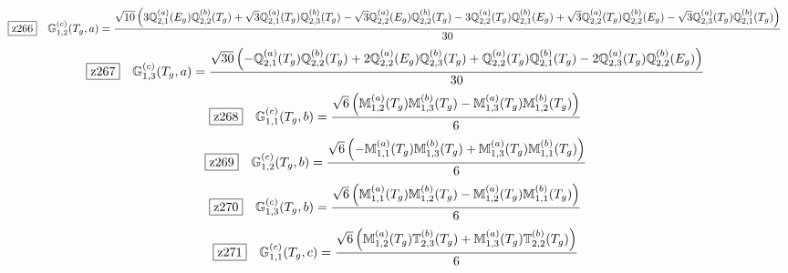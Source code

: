 \documentclass[fleqn,10pt,landscape]{jsarticle}
\begin{document}
\begin{dmath*}
\hspace*{3mm}\fbox{z266}\quad \mathbb{G}_{1,2}^{(c)}(T_{g},a)=\frac{\sqrt{10} \left(3 \mathbb{Q}_{2,1}^{(a)}(E_{g}) \mathbb{Q}_{2,2}^{(b)}(T_{g}) + \sqrt{3} \mathbb{Q}_{2,1}^{(a)}(T_{g}) \mathbb{Q}_{2,3}^{(b)}(T_{g}) - \sqrt{3} \mathbb{Q}_{2,2}^{(a)}(E_{g}) \mathbb{Q}_{2,2}^{(b)}(T_{g}) - 3 \mathbb{Q}_{2,2}^{(a)}(T_{g}) \mathbb{Q}_{2,1}^{(b)}(E_{g}) + \sqrt{3} \mathbb{Q}_{2,2}^{(a)}(T_{g}) \mathbb{Q}_{2,2}^{(b)}(E_{g}) - \sqrt{3} \mathbb{Q}_{2,3}^{(a)}(T_{g}) \mathbb{Q}_{2,1}^{(b)}(T_{g})\right)}{30}
\end{dmath*}
\begin{dmath*}
\hspace*{3mm}\fbox{z267}\quad \mathbb{G}_{1,3}^{(c)}(T_{g},a)=\frac{\sqrt{30} \left(- \mathbb{Q}_{2,1}^{(a)}(T_{g}) \mathbb{Q}_{2,2}^{(b)}(T_{g}) + 2 \mathbb{Q}_{2,2}^{(a)}(E_{g}) \mathbb{Q}_{2,3}^{(b)}(T_{g}) + \mathbb{Q}_{2,2}^{(a)}(T_{g}) \mathbb{Q}_{2,1}^{(b)}(T_{g}) - 2 \mathbb{Q}_{2,3}^{(a)}(T_{g}) \mathbb{Q}_{2,2}^{(b)}(E_{g})\right)}{30}
\end{dmath*}
\begin{dmath*}
\hspace*{3mm}\fbox{z268}\quad \mathbb{G}_{1,1}^{(c)}(T_{g},b)=\frac{\sqrt{6} \left(\mathbb{M}_{1,2}^{(a)}(T_{g}) \mathbb{M}_{1,3}^{(b)}(T_{g}) - \mathbb{M}_{1,3}^{(a)}(T_{g}) \mathbb{M}_{1,2}^{(b)}(T_{g})\right)}{6}
\end{dmath*}
\begin{dmath*}
\hspace*{3mm}\fbox{z269}\quad \mathbb{G}_{1,2}^{(c)}(T_{g},b)=\frac{\sqrt{6} \left(- \mathbb{M}_{1,1}^{(a)}(T_{g}) \mathbb{M}_{1,3}^{(b)}(T_{g}) + \mathbb{M}_{1,3}^{(a)}(T_{g}) \mathbb{M}_{1,1}^{(b)}(T_{g})\right)}{6}
\end{dmath*}
\begin{dmath*}
\hspace*{3mm}\fbox{z270}\quad \mathbb{G}_{1,3}^{(c)}(T_{g},b)=\frac{\sqrt{6} \left(\mathbb{M}_{1,1}^{(a)}(T_{g}) \mathbb{M}_{1,2}^{(b)}(T_{g}) - \mathbb{M}_{1,2}^{(a)}(T_{g}) \mathbb{M}_{1,1}^{(b)}(T_{g})\right)}{6}
\end{dmath*}
\begin{dmath*}
\hspace*{3mm}\fbox{z271}\quad \mathbb{G}_{1,1}^{(c)}(T_{g},c)=\frac{\sqrt{6} \left(\mathbb{M}_{1,2}^{(a)}(T_{g}) \mathbb{T}_{2,3}^{(b)}(T_{g}) + \mathbb{M}_{1,3}^{(a)}(T_{g}) \mathbb{T}_{2,2}^{(b)}(T_{g})\right)}{6}
\end{dmath*}
\end{document}
